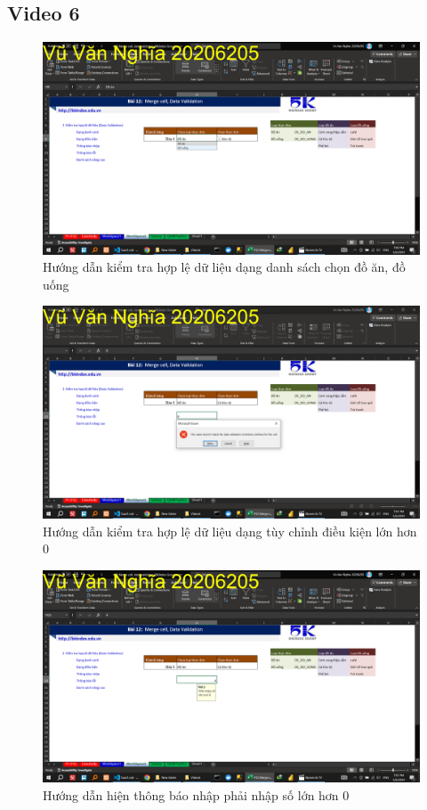\documentclass{article}
\begin{document}
\subsection{Video 6}
\begin{figure}[H]
\centering
\includegraphics[scale = 0.15]{Video6/HuongDan/0.png}
\caption{Hướng dẫn kiểm tra hợp lệ dữ liệu dạng danh sách chọn đồ ăn, đồ uống}
\end{figure}

\begin{figure}[H]
\centering
\includegraphics[scale = 0.15]{Video6/HuongDan/1.png}
\caption{Hướng dẫn kiểm tra hợp lệ dữ liệu dạng tùy chỉnh điều kiện lớn hơn 0}
\end{figure}

\begin{figure}[H]
\centering
\includegraphics[scale = 0.15]{Video6/HuongDan/2.png}
\caption{Hướng dẫn hiện thông báo nhập phải nhập số lớn hơn 0}
\end{figure}
\end{document}
